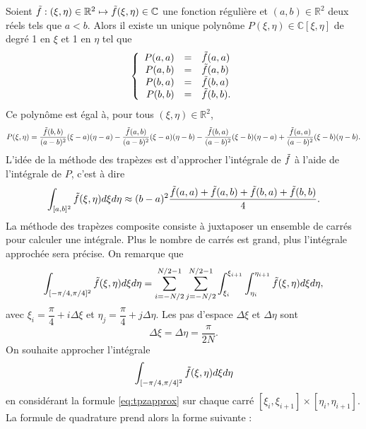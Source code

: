 Soient $\tilde{f} : (\xi, \eta) \in \mathbb{R}^2 \mapsto \tilde{f}(\xi, \eta) \in \mathbb{C}$ une fonction régulière et $(a,b) \in \mathbb{R}^2$ deux réels tels que $a<b$. Alors il existe un unique polynôme $P(\xi, \eta) \in \mathbb{C}[\xi, \eta]$ de degré 1 en $\xi$ et 1 en $\eta$ tel que 
\begin{equation}
\left\lbrace
\begin{array}{rcl}
P(a,a) & = & \tilde{f}(a,a) \\
P(a,b) & = & \tilde{f}(a,b) \\
P(b,a) & = & \tilde{f}(b,a) \\
P(b,b) & = & \tilde{f}(b,b).
\end{array}
\right.
\end{equation}
Ce polynôme est égal à, pour tous $(\xi, \eta) \in \mathbb{R}^2$,
\begin{equation}
P(\xi, \eta) = \dfrac{\tilde{f}(b,b)}{(a-b)^2}(\xi-a)(\eta-a) - \dfrac{\tilde{f}(a,b)}{(a-b)^2}(\xi-a)(\eta-b) -\dfrac{\tilde{f}(b,a)}{(a-b)^2}(\xi-b)(\eta-a)+ \dfrac{\tilde{f}(a,a)}{(a-b)^2}(\xi-b)(\eta-b).
\end{equation}
L'idée de la méthode des trapèzes est d'approcher l'intégrale de $\tilde{f}$ à l'aide de l'intégrale de $P$, c'est à dire
\begin{equation}
\displaystyle\int_{[a,b]^2} \tilde{f}(\xi, \eta) d\xi d\eta \approx (b-a)^2 \dfrac{\tilde{f}(a,a) + \tilde{f}(a,b) + \tilde{f}(b,a) + \tilde{f}(b,b)}{4}.
\label{eq:tpzapprox}
\end{equation}
La méthode des trapèzes composite consiste à juxtaposer un ensemble de carrés pour calculer une intégrale. Plus le nombre de carrés est grand, plus l'intégrale approchée sera précise. On remarque que
\begin{equation}
\displaystyle\int_{[-\pi/4,\pi/4]^2} \tilde{f}(\xi, \eta) d\xi d\eta = \displaystyle\sum\limits_{i=-N/2}^{N/2-1} \displaystyle\sum\limits_{j=-N/2}^{N/2-1} \displaystyle\int_{\xi_i}^{\xi_{i+1}} \displaystyle\int_{\eta_i}^{\eta_{i+1}} \tilde{f}(\xi, \eta) d\xi d\eta,
\end{equation}
avec $\xi_i = \dfrac{\pi}{4} + i \Delta \xi$ et $\eta_j = \dfrac{\pi}{4} + j \Delta \eta$. Les pas d'espace $\Delta \xi$ et $\Delta \eta$ sont
\begin{equation}
\Delta \xi = \Delta \eta = \dfrac{\pi}{2N}.
\end{equation}
On souhaite approcher l'intégrale
\begin{equation}
\displaystyle\int_{[-\pi/4,\pi/4]^2} \tilde{f}(\xi, \eta) d\xi d\eta
\end{equation}
en considérant la formule \eqref{eq:tpzapprox} sur chaque carré $\left[ \xi_i, \xi_{i+1} \right] \times \left[ \eta_i, \eta_{i+1} \right]$. La formule de quadrature prend alors la forme suivante :
